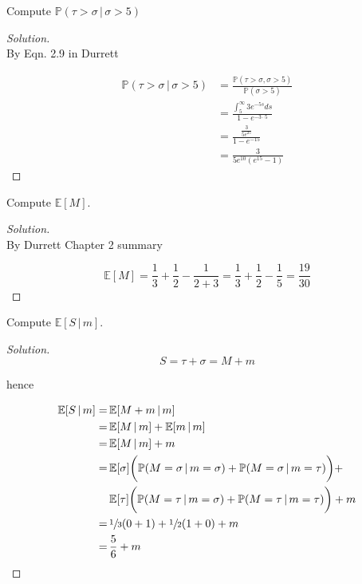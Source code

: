 \documentclass[12pt]{article}
\newenvironment{problem}[2][Problem]{\begin{trivlist}
\item[\hskip \labelsep {\bfseries #1}\hskip \labelsep {\bfseries #2.}]}{\end{trivlist}}
\newenvironment{solution}
  {\begin{proof}[Solution]\renewcommand{\qedsymbol}{}}
  {\end{proof}}
\begin{document}
\begin{problem}{3(b)}

Compute $\mathbb{P}(\tau > \sigma \,|\, \sigma >5)$

\end{problem}
\begin{solution}\ \\

By Eqn. 2.9 in Durrett 

\begin{align*}
\mathbb{P}(\tau > \sigma \,|\, \sigma >5) &= \frac{\mathbb{P}(\tau > \sigma, \sigma >5)}{\mathbb{P}(\sigma > 5)} \\
&= \frac{\int_5^\infty 3 e^{-5s}ds}{1-e^{-3\cdot5}} \\
&= \frac{\frac{3}{5 e^25}}{1-e^{-15}} \\
& = \frac{3}{5 e^{10}(e^{15}-1)}
\end{align*}

\end{solution}

\begin{problem}{3(c)}
Compute $\mathbb{E}[ M ]$.
\end{problem}
\begin{solution}\ \\

By Durrett Chapter 2 summary

$$
\mathbb{E}[ M ] = \frac{1}{3}+\frac{1}{2} - \frac{1}{2+3} = \frac{1}{3} + \frac{1}{2} - \frac{1}{5} = \frac{19}{30}
$$
\end{solution}

\begin{problem}{3(d)}
Compute $\mathbb{E}[S\, | \, m ]$.
\end{problem}
\begin{solution}\ \\

$$
S = \tau + \sigma = M + m  
$$

hence

\begin{align*}
\mathbb{E}[S\, | \, m ] =& \, \mathbb{E}[M + m \, | \, m ]  \\
=& \,\mathbb{E}[M \, | \, m ] + \mathbb{E}[ m \, | \, m ] \\
=&\, \mathbb{E}[M \, | \, m ] + m \\
=&\, \mathbb{E}[\sigma]\bigg( \mathbb{P}(M=\sigma \, | \,m=\sigma) + \mathbb{P} (M=\sigma \, | \,m=\tau) \bigg)+ \\
&\, \mathbb{E}[\tau]\bigg( \mathbb{P} (M=\tau \, | \,m=\sigma) + \mathbb{P} (M=\tau \, | \,m=\tau) \bigg) + m \\
=&\, \sfrac{1}{3}(0+1)+\sfrac{1}{2}(1+0) + m \\
=&\, \frac{5}{6} + m 
\end{align*}
\end{solution}
\end{document}
